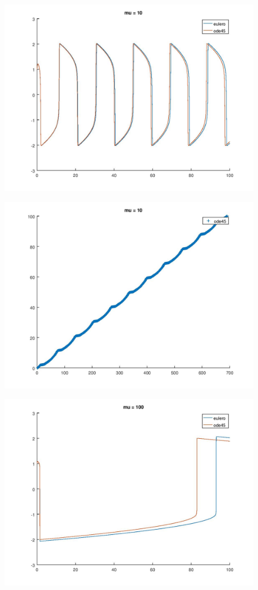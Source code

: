 \documentclass{article}
\begin{document}
	\begin{figure}[htp!]
		\centering 
		\includegraphics[width=\textwidth]{6_3_3.jpeg}
	\end{figure}
	\begin{figure}[htp!]
		\centering 
		\includegraphics[width=\textwidth]{6_3_3_a.jpeg}
	\end{figure}
	\begin{figure}[htp!]
		\centering 
		\includegraphics[width=\textwidth]{6_3_4.jpeg}
	\end{figure}
\end{document}
